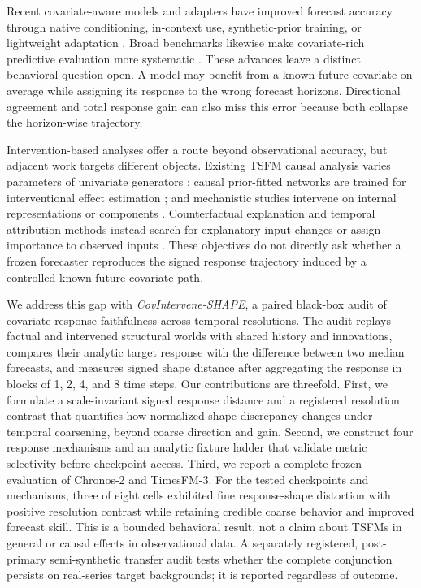 \documentclass[conference]{IEEEtran}
\begin{document}
Recent covariate-aware models and adapters have improved forecast accuracy through
native conditioning, in-context use, synthetic-prior training, or lightweight
adaptation \cite{arango2025chronosx,auer2025cosmic,han2025unica,
dange2025tfmadapter,yamaguchi2025citras,yamaguchi2026citrasfm,
potapczynski2026apollopfn}. Broad benchmarks likewise make covariate-rich predictive
evaluation more systematic \cite{shchur2025fevbench}. These advances leave a distinct
behavioral question open. A model may benefit from a known-future covariate on average
while assigning its response to the wrong forecast horizons. Directional agreement and
total response gain can also miss this error because both collapse the horizon-wise
trajectory.

Intervention-based analyses offer a route beyond observational accuracy, but adjacent
work targets different objects. Existing TSFM causal analysis varies parameters of
univariate generators \cite{jander2026causalanalysis}; causal prior-fitted networks are
trained for interventional effect estimation \cite{thumm2026causaltimeprior}; and
mechanistic studies intervene on internal representations or components
\cite{wilinski2025representations,asiaee2026certified}. Counterfactual explanation and
temporal attribution methods instead search for explanatory input changes or assign
importance to observed inputs \cite{wang2023forecastcf,kinjo2025cetx,
yan2023counts,jang2025timing}. These objectives do not directly ask whether a frozen
forecaster reproduces the signed response trajectory induced by a controlled
known-future covariate path.

We address this gap with \emph{CovIntervene-SHAPE}, a paired black-box audit of
covariate-response faithfulness across temporal resolutions. The audit replays factual
and intervened structural worlds with shared history and innovations, compares their
analytic target response with the difference between two median forecasts, and measures
signed shape distance after aggregating the response in blocks of 1, 2, 4, and 8 time
steps. Our contributions are threefold. First, we formulate a scale-invariant signed
response distance and a registered resolution contrast that quantifies how normalized
shape discrepancy changes under temporal coarsening, beyond coarse direction and gain.
Second, we construct four response mechanisms and an
analytic fixture ladder that validate metric selectivity before checkpoint access.
Third, we report a complete frozen evaluation of Chronos-2 and TimesFM-3. For the tested
checkpoints and mechanisms, three of eight cells exhibited fine response-shape
distortion with positive resolution contrast while retaining credible coarse behavior
and improved forecast skill. This is a bounded behavioral result, not a claim about TSFMs
in general or causal effects in observational data. A separately registered,
post-primary semi-synthetic transfer audit tests whether the complete conjunction
persists on real-series target backgrounds; it is reported regardless of outcome.
\end{document}
